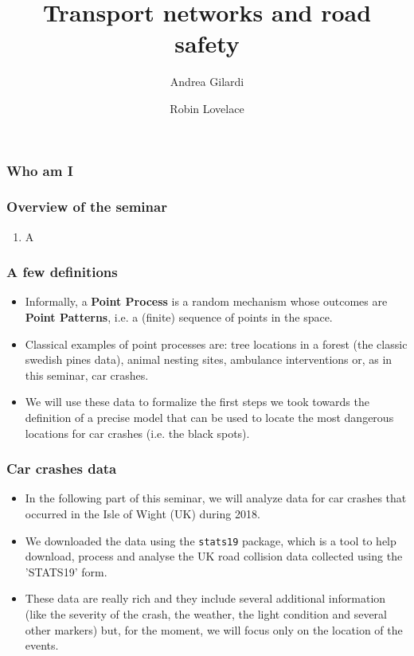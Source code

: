 \documentclass[c,10pt,pdftex]{beamer}
\title{Transport networks and road safety}
\author{Andrea Gilardi \inst{1} \and Robin Lovelace \inst{2}}
\institute{\inst{1} University of Milan - Bicocca \and \inst{2} University of Leeds - ITS}
\begin{document}
\inserttitlepage

\begin{frame}
\frametitle{Who am I}
\end{frame}

\begin{frame}
\frametitle{Overview of the seminar}
\begin{enumerate}
	\item A
\end{enumerate}
\end{frame}

\begin{frame}
\frametitle{A few definitions}
\vspace{-0.75cm}
\begin{itemize}
	\setlength\itemsep{1em}
	\item Informally, a \textbf{Point Process} is a random mechanism whose outcomes are \textbf{Point Patterns}, i.e. a (finite) sequence of points in the space. 
	
	\item Classical examples of point processes are: tree locations in a forest (the classic swedish pines data), animal nesting sites, ambulance interventions or, as  in this seminar, car crashes. 
	
	\item We will use these data to formalize the first steps we took towards the definition of a precise model that can be used to locate the most dangerous locations for car crashes (i.e. the black spots). 
\end{itemize}
\end{frame}

\begin{frame}
\frametitle{Car crashes data}
\vspace{-0.75cm}
\begin{itemize}
	\setlength\itemsep{1em}
	\item In the following part of this seminar, we will analyze data for car crashes that occurred in the Isle of Wight (UK) during 2018. 
	
	\item We downloaded the data using the \texttt{stats19} package, which is a tool to help download, process and analyse the UK road collision data collected using the 'STATS19' form. 
	
	\item These data are really rich and they include several additional information (like the severity of the crash, the weather, the light condition and several other markers) but, for the moment, we will focus only on the location of the events. 
\end{itemize}
\end{frame}
\end{document}
